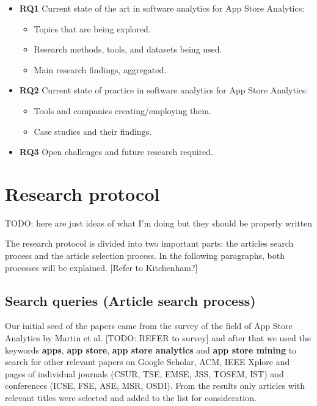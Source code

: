 \documentclass[]{book}
\providecommand{\tightlist}{%
  \setlength{\itemsep}{0pt}\setlength{\parskip}{0pt}}
\begin{document}
\begin{itemize}
\tightlist
\item
  \textbf{RQ1} Current state of the art in software analytics for App
  Store Analytics:

  \begin{itemize}
  \tightlist
  \item
    Topics that are being explored.
  \item
    Research methods, tools, and datasets being used.
  \item
    Main research findings, aggregated.
  \end{itemize}
\item
  \textbf{RQ2} Current state of practice in software analytics for App
  Store Analytics:

  \begin{itemize}
  \tightlist
  \item
    Tools and companies creating/employing them.
  \item
    Case studies and their findings.
  \end{itemize}
\item
  \textbf{RQ3} Open challenges and future research required.
\end{itemize}

\section{Research protocol}\label{research-protocol-4}

TODO: here are just ideas of what I'm doing but they should be properly
written

The research protocol is divided into two important parts: the articles
search process and the article selection process. In the following
paragraphs, both processes will be explained. {[}Refer to Kitchenham?{]}

\subsection{Search queries (Article search
process)}\label{search-queries-article-search-process}

Our initial seed of the papers came from the survey of the field of App
Store Analytics by Martin et al. {[}TODO: REFER to survey{]} and after
that we used the keywords \textbf{apps}, \textbf{app store}, \textbf{app
store analytics} and \textbf{app store mining} to search for other
relevant papers on Google Scholar, ACM, IEEE Xplore and pages of
individual journals (CSUR, TSE, EMSE, JSS, TOSEM, IST) and conferences
(ICSE, FSE, ASE, MSR, OSDI). From the results only articles with
relevant titles were selected and added to the list for consideration.
\end{document}
